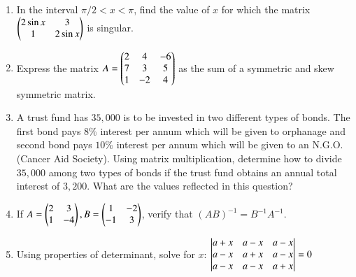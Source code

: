 \begin{enumerate}
\item In the interval ${\pi}/2<x<\pi$, find the value of $x$ for which the matrix $\begin{pmatrix}2\sin{x} & 3 \\ 1 & 2\sin{x}\end{pmatrix}$ is singular.

\item Express the matrix $A = \begin{pmatrix}2&4&-6\\7&3&5\\1&-2&4\end{pmatrix}$ as the sum of a symmetric and skew symmetric matrix. 

\item A trust fund has \rupee $35,000$ is to be invested in two different types of bonds. The first bond pays $8\%$ interest per annum which will be given to orphanage and second bond pays $10\%$ interest per annum which will be given to an N.G.O. (Cancer Aid Society). Using matrix multiplication, determine how to divide \rupee $35,000$ among two types of bonds if the trust fund obtains an annual total interest of \rupee $3,200$. What are the values reflected in this question? 

\item If $A = \begin{pmatrix}2&3\\1&-4\end{pmatrix}, B = \begin{pmatrix}1&-2\\-1&3\end{pmatrix}$, verify that $(AB)^{-1} = B^{-1}A^{-1}$. 

\item Using properties of determinant, solve for $x$:
$\begin{vmatrix}a+x & a-x & a-x \\ a-x & a+x & a-x \\ a-x & a-x & a+x\end{vmatrix} = 0$ 
\end{enumerate} 
